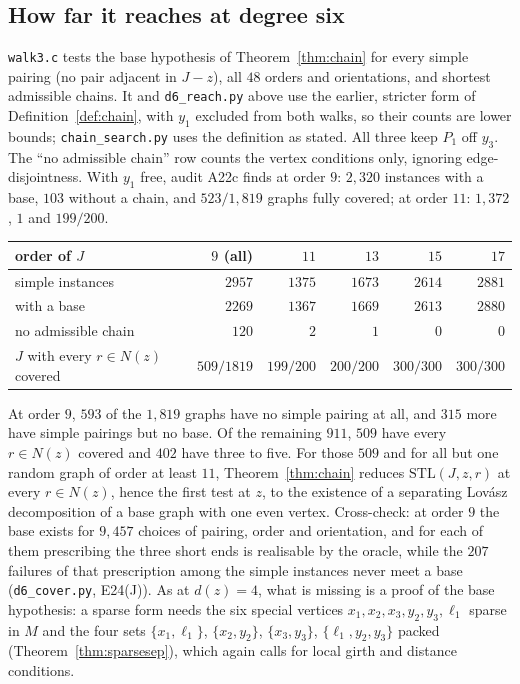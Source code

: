 \documentclass[11pt]{amsart}
\theoremstyle{definition}
\newcommand{\STL}{\mathrm{STL}}
\begin{document}
\subsection*{How far it reaches at degree six}
\texttt{walk3.c} tests the base hypothesis of Theorem~\ref{thm:chain} for every simple pairing
(no pair adjacent in $J-z$), all $48$ orders and orientations, and shortest admissible chains.
It and \texttt{d6\_reach.py} above use the earlier, stricter form of Definition~\ref{def:chain},
with $y_1$ excluded from both walks, so their counts are lower bounds; \texttt{chain\_search.py}
uses the definition as stated. All three keep $P_1$ off $y_3$. The ``no admissible chain'' row
counts the vertex conditions only, ignoring edge-disjointness. With $y_1$ free, audit A22c finds
at order $9$: $2{,}320$ instances with a base, $103$ without a chain, and $523/1{,}819$ graphs
fully covered; at order $11$: $1{,}372$, $1$ and $199/200$.
\begin{center}\footnotesize
\begin{tabular}{@{}lrrrrr@{}}
\toprule
order of $J$ & $9$ (all) & $11$ & $13$ & $15$ & $17$\\
\midrule
simple instances & $2957$ & $1375$ & $1673$ & $2614$ & $2881$\\
with a base & $2269$ & $1367$ & $1669$ & $2613$ & $2880$\\
no admissible chain & $120$ & $2$ & $1$ & $0$ & $0$\\
$J$ with every $r\in N(z)$ covered & $509/1819$ & $199/200$ & $200/200$ & $300/300$ & $300/300$\\
\bottomrule
\end{tabular}
\end{center}
At order $9$, $593$ of the $1{,}819$ graphs have no simple pairing at all, and $315$ more have
simple pairings but no base. Of the remaining $911$, $509$ have every $r\in N(z)$ covered and $402$
have three to five. For those $509$ and for all but one random graph of order at least $11$,
Theorem~\ref{thm:chain} reduces $\STL(J,z,r)$ at every $r\in N(z)$, hence the first test at $z$,
to the existence of a separating Lov\'asz decomposition of a base graph with one even vertex.
Cross-check: at order $9$ the base exists for $9{,}457$ choices of pairing, order and
orientation, and for each of them prescribing the three short ends is realisable by the oracle,
while the $207$ failures of that prescription among the simple instances never meet a base
(\texttt{d6\_cover.py}, E24(J)). As at $d(z)=4$, what is missing is a proof of the base
hypothesis: a sparse form needs the six special vertices $x_1,x_2,x_3,y_2,y_3,\ell_1$ sparse in
$M$ and the four sets $\{x_1,\ell_1\}$, $\{x_2,y_2\}$, $\{x_3,y_3\}$, $\{\ell_1,y_2,y_3\}$ packed
(Theorem~\ref{thm:sparsesep}), which again calls for local girth and distance conditions.
\end{document}
